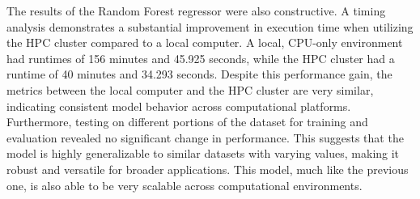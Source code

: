 \documentclass[conference]{IEEEtran}
\begin{document}
The results of the Random Forest regressor were also constructive. A timing analysis demonstrates a substantial improvement in execution time when utilizing the HPC cluster compared to a local computer. A local, CPU-only environment had runtimes of 156 minutes and 45.925 seconds, while the HPC cluster had a runtime of 40 minutes and 34.293 seconds. Despite this performance gain, the metrics between the local computer and the HPC cluster are very similar, indicating consistent model behavior across computational platforms. Furthermore, testing on different portions of the dataset for training and evaluation revealed no significant change in performance. This suggests that the model is highly generalizable to similar datasets with varying values, making it robust and versatile for broader applications. This model, much like the previous one, is also able to be very scalable across computational environments. 
\end{document}
